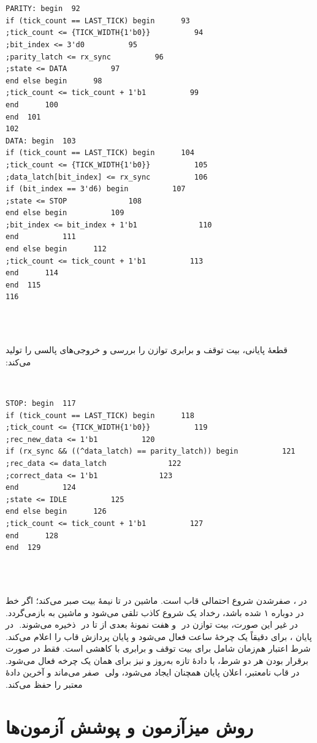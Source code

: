 ‫\begin{dsdlcodeblock}
‫\begin{verbatim}
‫92  PARITY: begin
‫93      if (tick_count == LAST_TICK) begin
‫94          tick_count <= {TICK_WIDTH{1'b0}};
‫95          bit_index <= 3'd0;
‫96          parity_latch <= rx_sync;
‫97          state <= DATA;
‫98      end else begin
‫99          tick_count <= tick_count + 1'b1;
‫100      end
‫101  end
‫102
‫103  DATA: begin
‫104      if (tick_count == LAST_TICK) begin
‫105          tick_count <= {TICK_WIDTH{1'b0}};
‫106          data_latch[bit_index] <= rx_sync;
‫107          if (bit_index == 3'd6) begin
‫108              state <= STOP;
‫109          end else begin
‫110              bit_index <= bit_index + 1'b1;
‫111          end
‫112      end else begin
‫113          tick_count <= tick_count + 1'b1;
‫114      end
‫115  end
‫116
‫\end{verbatim}
‫\end{dsdlcodeblock}
‫
‫قطعهٔ پایانی، بیت توقف و برابری توازن را بررسی و خروجی‌های پالسی را تولید می‌کند:
‫
‫\begin{dsdlcodeblock}
‫\begin{verbatim}
‫117  STOP: begin
‫118      if (tick_count == LAST_TICK) begin
‫119          tick_count <= {TICK_WIDTH{1'b0}};
‫120          rec_new_data <= 1'b1;
‫121          if (rx_sync && ((^data_latch) == parity_latch)) begin
‫122              rec_data <= data_latch;
‫123              correct_data <= 1'b1;
‫124          end
‫125          state <= IDLE;
‫126      end else begin
‫127          tick_count <= tick_count + 1'b1;
‫128      end
‫129  end
‫\end{verbatim}
‫\end{dsdlcodeblock}
‫
‫در ، صفرشدن  شروع احتمالی قاب است. ماشین در  تا
‫نیمهٔ بیت صبر می‌کند؛ اگر خط در  دوباره ۱ شده باشد، رخداد یک شروع کاذب
‫تلقی می‌شود و ماشین به  بازمی‌گردد. در غیر این صورت، بیت توازن در
‫ و هفت نمونهٔ بعدی از  تا  در
‫ ذخیره می‌شوند.
‫
‫در پایان ،  برای دقیقاً یک چرخهٔ ساعت فعال می‌شود و پایان
‫پردازش قاب را اعلام می‌کند. شرط اعتبار هم‌زمان شامل  برای بیت توقف و
‫برابری  با  کاهشی  است. فقط در صورت
‫برقرار بودن هر دو شرط،  با دادهٔ تازه به‌روز و  نیز
‫برای همان یک چرخه فعال می‌شود. در قاب نامعتبر، اعلان پایان همچنان ایجاد می‌شود، ولی
‫ صفر می‌ماند و  آخرین دادهٔ معتبر را حفظ می‌کند.
‫
‫
‫\section{روش میزآزمون و پوشش آزمون‌ها}
